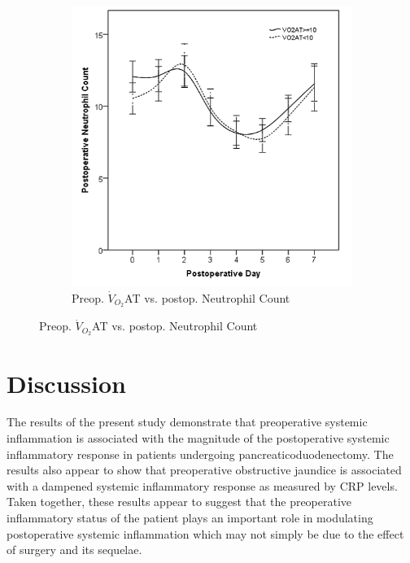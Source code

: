 \begin{figure}[p]
	\vspace{1cm}
		

	\begin{subfigure}{0.48\textwidth}
		\centering
		\includegraphics[width=\textwidth]{Figures/sirs_at_neut}
		\caption{Preop. $\dot{V}_{O_2}$AT vs. 
postop. 
Neutrophil Count}
		\label{fig:sirs_at_neut}
	\end{subfigure}	
\end{figure}







\clearpage
\section{Discussion}

The results of the present study demonstrate that preoperative systemic inflammation is associated with the magnitude of the postoperative systemic inflammatory response  in patients undergoing pancreaticoduodenectomy. 
The results also appear to show that preoperative obstructive jaundice is associated with a dampened systemic inflammatory response as measured by CRP levels. 
Taken together, these results appear to suggest that the preoperative inflammatory status of the patient plays an important role in modulating postoperative systemic inflammation which may not simply be due to the effect of surgery and its sequelae.

